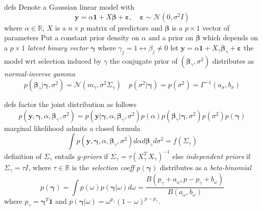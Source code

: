 \documentclass{beamer}
\newcommand{\vect}[1]{\boldsymbol{#1}}
\begin{document}
\begin{frame}{defs}
Denote a Gaussian linear model with
\begin{displaymath}
    \vect{y} = \alpha\vect{1} + X\vect{\beta} + \vect{\varepsilon},\quad\vect{\varepsilon}\sim\mathcal{N}(0, \sigma^{2}I)
\end{displaymath}
where $\alpha\in\mathbb{R}$, $X$ is a $n\times p$ matrix of predictors 
and $\vect{\beta}$ is a $p\times1$ vector of parameters
\vfill
Put a constant prior density on $\alpha$ and a prior on $\vect{\beta}$ which
depends on a $p\times1$ \emph{latent binary vector} $\vect{\gamma}$ where
$\gamma_{j}=1 \leftrightarrow \beta_{j}\neq0$
\vfill
let $\vect{y} = \alpha\vect{1} + X_{\gamma}\vect{\beta}_{\gamma} + \vect{\varepsilon}$ the model
wrt selection induced by $\gamma$
\vfill
the conjugate prior of $(\vect{\beta}_{\gamma}, \sigma^{2})$ distributes as 
\emph{normal-inverse gamma}
\begin{displaymath}
    p(\vect{\beta}_{\gamma}|\vect{\gamma}, \sigma^{2}) = \mathcal{N}(m_{\gamma}, \sigma^{2}\Sigma_{\gamma})\quad
    p(\sigma^{2}|\vect{\gamma}) = p(\sigma^{2}) = \mathcal{\Gamma}^{-1}(a_{\sigma}, b_{\sigma})
\end{displaymath}
\end{frame}

\begin{frame}{defs}
factor the joint distribution as follows
\begin{displaymath}
    p(\vect{y}, \vect{\gamma}, \alpha, \vect{\beta}_{\gamma}, \sigma^{2}) = 
        p(\vect{y}|\vect{\gamma}, \alpha, \vect{\beta}_{\gamma}, \sigma^{2})
        p(\alpha)p(\vect{\beta}_{\gamma}|\vect{\gamma}, \sigma^{2})p(\sigma^{2})p(\vect{\gamma}) 
\end{displaymath}
\vfill
marginal likelihood admits a closed formula
\begin{displaymath}
    \int{p(\vect{y}, \vect{\gamma}, \alpha, \vect{\beta}_{\gamma},
    \sigma^{2})}d\alpha d\vect{\beta}_{\gamma} d\sigma^{2} = f(\Sigma_{\gamma})
\end{displaymath}
\vfill
definition of $\Sigma_{\gamma}$ entails \emph{$g$-priors} if $\Sigma_{\gamma} =
\tau \left(X_{\gamma}^{T}\,X_{\gamma}\right)^{-1}$ else \emph{independent
priors} if $\Sigma_{\gamma} = \tau I$, where $\tau\in\mathbb{R}$ is the
\emph{selection coeff}
\vfill
$p(\vect{\gamma})$ distributes as a \emph{beta-binomial}
\begin{displaymath}
p(\vect{\gamma}) = \int{p(\omega)p(\vect{\gamma}|\omega)d\omega} =
\frac{B(p_{\gamma}+a_{\omega}, p-p_{\gamma}+b_{\omega})}{B(a_{\omega},
b_{\omega})}
\end{displaymath}
where $p_{\gamma}=\vect{\gamma}^{T}\vect{1}$ and
$p(\vect{\gamma}|\omega)=\omega^{p_{\gamma}}(1-\omega)^{p-p_{\gamma}}$.
\end{frame}
\end{document}
